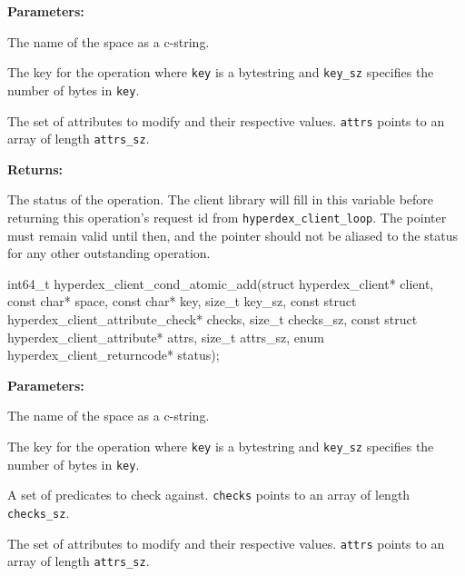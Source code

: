 \noindent\textbf{Parameters:}
\begin{description}[labelindent=\widthof{{\texttt{attrs}, \texttt{attrs\_sz}}},leftmargin=*,noitemsep,nolistsep,align=right]
\item[\texttt{space}] The name of the space as a c-string.
\item[\texttt{key}, \texttt{key\_sz}] The key for the operation where \texttt{key} is a bytestring and \texttt{key\_sz} specifies the number of bytes in \texttt{key}.
\item[\texttt{attrs}, \texttt{attrs\_sz}] The set of attributes to modify and their respective values.  \texttt{attrs} points to an array of length \texttt{attrs\_sz}.
\end{description}

\noindent\textbf{Returns:}
\begin{description}[labelindent=\widthof{{\texttt{status}}},leftmargin=*,noitemsep,nolistsep,align=right]
\item[\texttt{status}] The status of the operation.  The client library will fill in this variable before returning this operation's request id from \texttt{hyperdex\_client\_loop}.  The pointer must remain valid until then, and the pointer should not be aliased to the status for any other outstanding operation.
\end{description}

\funcsep
\begin{ccode}
int64_t hyperdex_client_cond_atomic_add(struct hyperdex_client* client,
                const char* space,
                const char* key, size_t key_sz,
                const struct hyperdex_client_attribute_check* checks, size_t checks_sz,
                const struct hyperdex_client_attribute* attrs, size_t attrs_sz,
                enum hyperdex_client_returncode* status);
\end{ccode}
\funcdesc 

\noindent\textbf{Parameters:}
\begin{description}[labelindent=\widthof{{\texttt{checks}, \texttt{checks\_sz}}},leftmargin=*,noitemsep,nolistsep,align=right]
\item[\texttt{space}] The name of the space as a c-string.
\item[\texttt{key}, \texttt{key\_sz}] The key for the operation where \texttt{key} is a bytestring and \texttt{key\_sz} specifies the number of bytes in \texttt{key}.
\item[\texttt{checks}, \texttt{checks\_sz}] A set of predicates to check against.  \texttt{checks} points to an array of length \texttt{checks\_sz}.
\item[\texttt{attrs}, \texttt{attrs\_sz}] The set of attributes to modify and their respective values.  \texttt{attrs} points to an array of length \texttt{attrs\_sz}.
\end{description}

